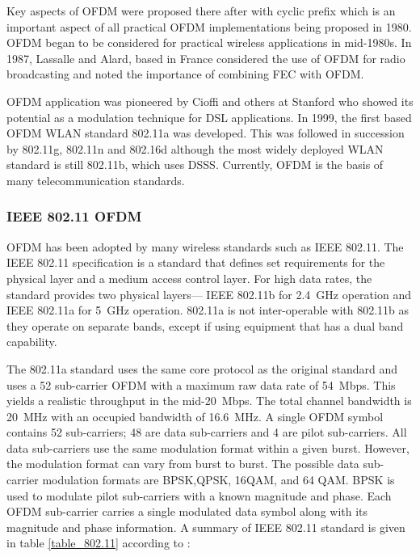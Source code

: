 Key aspects of \gls{OFDM} were proposed there after with cyclic prefix which is an important aspect of all practical \gls{OFDM} implementations being proposed in 1980. \gls{OFDM} began to be considered for practical wireless applications in mid-1980s. In 1987, Lassalle and
 Alard, based in France considered the use of \gls{OFDM} for
radio broadcasting and noted the importance of combining
\gls{FEC} with \gls{OFDM}. 

\gls{OFDM} application was pioneered by Cioffi and others at Stanford who showed its potential as a modulation technique for \gls{DSL} applications. In 1999, the first based \gls{OFDM} \gls{WLAN} standard 802.11a was developed. This was followed in succession by 802.11g, 802.11n and 802.16d although the most widely deployed \gls{WLAN} standard is still 802.11b, which uses \gls{DSSS}. Currently, \gls{OFDM} is the basis of many telecommunication standards.

\subsubsection{IEEE 802.11 OFDM}
\gls{OFDM} has been adopted by many wireless standards such as IEEE 802.11. The IEEE 802.11 specification is a standard that defines set requirements for the physical layer and a medium access control layer. For high data rates, the standard provides two physical layers--- IEEE 802.11b for \SI{2.4}{\giga\hertz} operation and IEEE 802.11a for \SI{5}{\giga\hertz} operation\cite{802.11}. 802.11a is not inter-operable with 802.11b as they operate on separate bands, except if using equipment that has a dual band capability.

 The 802.11a standard uses the same core protocol as the original standard and uses a 52 sub-carrier \gls{OFDM} with a maximum raw data rate of \SI{54}{Mbps}. This yields a realistic throughput in the mid-\SI{20}{Mbps}. The total channel bandwidth is \SI{20}{\mega\hertz} with an occupied bandwidth of \SI{16.6}{\mega\hertz}. A single \gls{OFDM} symbol contains 52 sub-carriers; 48 are data sub-carriers and 4 are pilot sub-carriers. All data sub-carriers use the same modulation format within a given burst. However, the modulation format can vary from burst to burst. The possible data sub-carrier modulation formats are \gls{BPSK},\gls{QPSK}, 16\gls {QAM}, and 64 \gls{QAM}. \gls{BPSK} is used to modulate pilot sub-carriers with a known magnitude and phase. Each \gls{OFDM} sub-carrier carries a single modulated data symbol along with its magnitude and phase information. A summary of IEEE 802.11 standard is given in table \ref{table_802.11} according to \cite{IEEE}:
 
